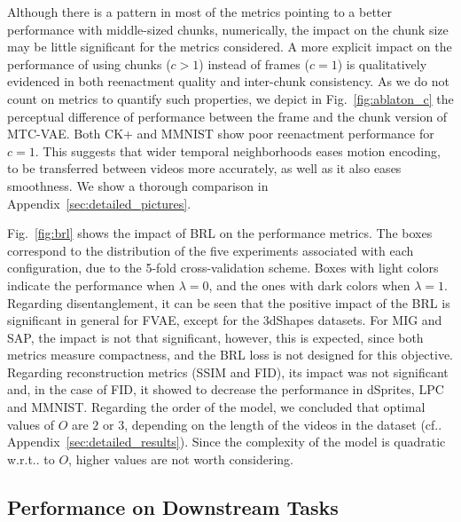 \documentclass[journal]{IEEEtran}
\makeatletter
\DeclareRobustCommand\onedot{\futurelet\@let@token\@onedot}
\def\@onedot{\ifx\@let@token.\else.\null\fi\xspace}
\def\cf{{cf}\onedot} \def\Cf{{Cf}\onedot}
\def\wrt{w.r.t\onedot} \def\dof{d.o.f\onedot}
\makeatother
\begin{document}
Although there is a pattern in most of the metrics pointing to a better performance with middle-sized chunks, numerically, the impact on the chunk size may be little significant for the metrics considered.
A more explicit impact on the performance of using chunks ($c > 1$) instead of frames ($c = 1$) is qualitatively evidenced in both reenactment quality and inter-chunk consistency.
As we do not count on metrics to quantify such properties, we depict in Fig.~\ref{fig:ablaton_c} the perceptual difference of performance between the frame and the chunk version of MTC-VAE.
Both CK+ and MMNIST show poor reenactment performance for $c=1$.
This suggests that wider temporal neighborhoods eases motion encoding, to be transferred between videos more accurately, as well as it also eases smoothness.
We show a thorough comparison in Appendix~\ref{sec:detailed_pictures}.

Fig.~\ref{fig:brl} shows the impact of BRL on the performance metrics.
The boxes correspond to the distribution of the five experiments associated with each configuration, due to the 5-fold cross-validation scheme.
Boxes with light colors indicate the performance when $\lambda = 0$, and the ones with dark colors when $\lambda = 1$.
Regarding disentanglement, it can be seen that the positive impact of the BRL is significant in general for FVAE, except for the 3dShapes datasets.
For MIG and SAP, the impact is not that significant, however, this is expected, since both metrics measure compactness, and the BRL loss is not designed for this objective.
Regarding reconstruction metrics (SSIM and FID), its impact was not significant and, in the case of FID, it showed to decrease the performance in dSprites, LPC and MMNIST\@.
Regarding the order of the model, we concluded that optimal values of $O$ are $2$ or $3$, depending on the length of the videos in the dataset (\cf Appendix~\ref{sec:detailed_results}).
Since the complexity of the model is quadratic \wrt to $O$, higher values are not worth considering.

\subsection{Performance on Downstream Tasks}
\label{sec:dt}
\end{document}
